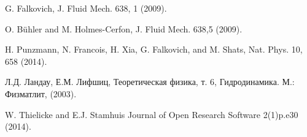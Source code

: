 \begin{thebibliography}{99}




G. Falkovich, J. Fluid Mech. 638, 1 (2009).

O. Bühler and M. Holmes-Cerfon, J. Fluid Mech. 638,5 (2009).

H. Punzmann, N. Francois, H. Xia, G. Falkovich, and M. Shats, Nat. Phys. 10, 658 (2014).







Л.Д. Ландау, Е.М. Лифшиц, Теоретическая физика, т. 6, Гидродинамика. М.: Физматлит, (2003).

W. Thielicke and E.J. Stamhuis Journal of Open Research Software 2(1)p.e30 (2014).




\end{thebibliography}
